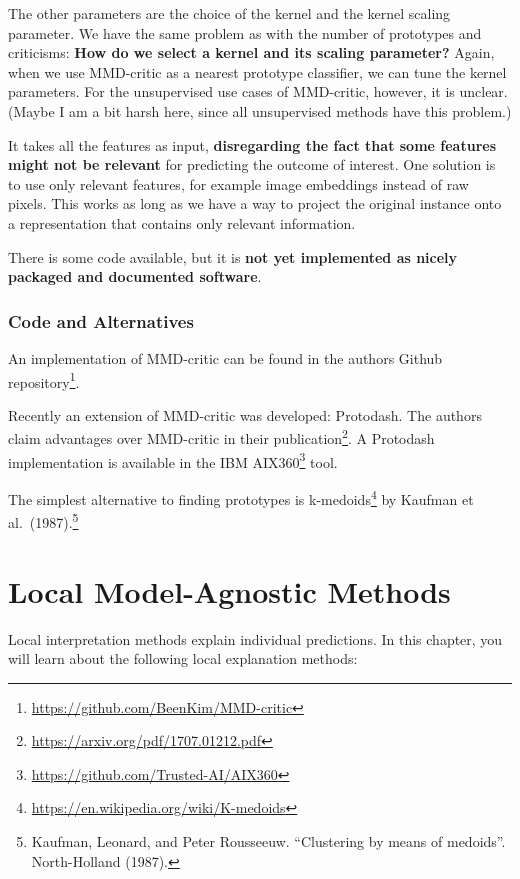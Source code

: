 \documentclass[
  11pt,
]{scrbook}
\renewcommand{\href}[2]{#2\footnote{\url{#1}}}
\begin{document}
The other parameters are the choice of the kernel and the kernel scaling parameter.
We have the same problem as with the number of prototypes and criticisms:
\textbf{How do we select a kernel and its scaling parameter?}
Again, when we use MMD-critic as a nearest prototype classifier, we can tune the kernel parameters.
For the unsupervised use cases of MMD-critic, however, it is unclear.
(Maybe I am a bit harsh here, since all unsupervised methods have this problem.)

It takes all the features as input, \textbf{disregarding the fact that some features might not be relevant} for predicting the outcome of interest.
One solution is to use only relevant features, for example image embeddings instead of raw pixels.
This works as long as we have a way to project the original instance onto a representation that contains only relevant information.

There is some code available, but it is \textbf{not yet implemented as nicely packaged and documented software}.

\hypertarget{code-and-alternatives}{%
\subsection{Code and Alternatives}\label{code-and-alternatives}}

An implementation of MMD-critic can be found in \href{https://github.com/BeenKim/MMD-critic}{the authors Github repository}.

Recently an extension of MMD-critic was developed: Protodash.
The authors claim advantages over MMD-critic in their \href{https://arxiv.org/pdf/1707.01212.pdf}{publication}.
A Protodash implementation is available in the \href{https://github.com/Trusted-AI/AIX360}{IBM AIX360} tool.

The simplest alternative to finding prototypes is \href{https://en.wikipedia.org/wiki/K-medoids}{k-medoids} by Kaufman et al.~(1987).\footnote{Kaufman, Leonard, and Peter Rousseeuw. ``Clustering by means of medoids''. North-Holland (1987).}

\hypertarget{local-methods}{%
\chapter{Local Model-Agnostic Methods}\label{local-methods}}

Local interpretation methods explain individual predictions.
In this chapter, you will learn about the following local explanation methods:
\end{document}
